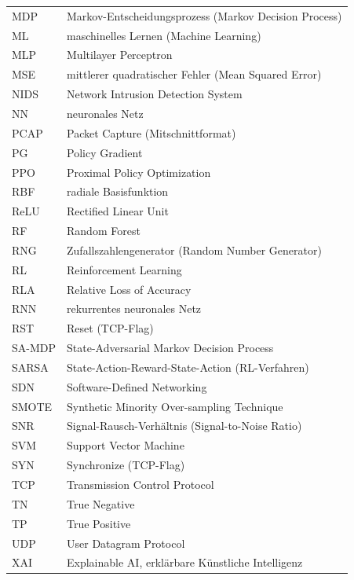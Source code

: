 \begin{longtable}{@{}p{2.3cm}p{12.4cm}@{}}
MDP & Markov-Entscheidungsprozess (Markov Decision Process) \\
ML & maschinelles Lernen (Machine Learning) \\
MLP & Multilayer Perceptron \\
MSE & mittlerer quadratischer Fehler (Mean Squared Error) \\
NIDS & Network Intrusion Detection System \\
NN & neuronales Netz \\
PCAP & Packet Capture (Mitschnittformat) \\
PG & Policy Gradient \\
PPO & Proximal Policy Optimization \\
RBF & radiale Basisfunktion \\
ReLU & Rectified Linear Unit \\
RF & Random Forest \\
RNG & Zufallszahlengenerator (Random Number Generator) \\
RL & Reinforcement Learning \\
RLA & Relative Loss of Accuracy \\
RNN & rekurrentes neuronales Netz \\
RST & Reset (TCP-Flag) \\
SA-MDP & State-Adversarial Markov Decision Process \\
SARSA & State-Action-Reward-State-Action (RL-Verfahren) \\
SDN & Software-Defined Networking \\
SMOTE & Synthetic Minority Over-sampling Technique \\
SNR & Signal-Rausch-Verhältnis (Signal-to-Noise Ratio) \\
SVM & Support Vector Machine \\
SYN & Synchronize (TCP-Flag) \\
TCP & Transmission Control Protocol \\
TN & True Negative \\
TP & True Positive \\
UDP & User Datagram Protocol \\
XAI & Explainable AI, erklärbare Künstliche Intelligenz \\
\end{longtable}
\endgroup

